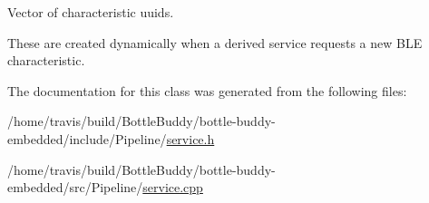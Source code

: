 Vector of characteristic uuids. 

These are created dynamically when a derived service requests a new B\+LE characteristic. 

The documentation for this class was generated from the following files\+:\begin{DoxyCompactItemize}
\item 
/home/travis/build/\+Bottle\+Buddy/bottle-\/buddy-\/embedded/include/\+Pipeline/\hyperlink{service_8h}{service.\+h}\item 
/home/travis/build/\+Bottle\+Buddy/bottle-\/buddy-\/embedded/src/\+Pipeline/\hyperlink{service_8cpp}{service.\+cpp}\end{DoxyCompactItemize}
